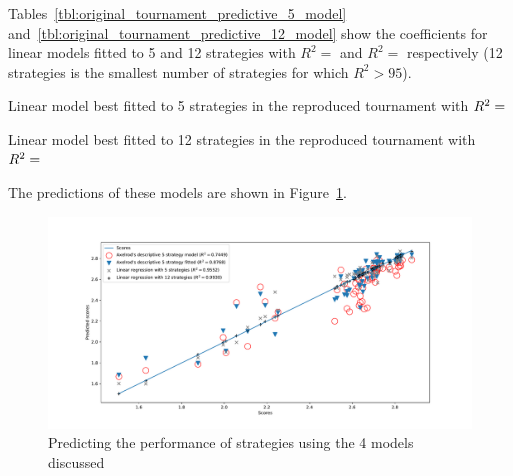 \documentclass{article}
\begin{document}
Tables~\ref{tbl:original_tournament_predictive_5_model}
and~\ref{tbl:original_tournament_predictive_12_model} show the coefficients for
linear models fitted to 5 and 12 strategies with
\(R^2=\) and
\(R^2=\)
respectively (12 strategies is the smallest number of strategies for which
\(R^2>95\)).


\begin{table}[!hbtp]
        \centering
        
        \caption{Linear model best fitted to 5 strategies in the reproduced tournament
                 with
             \(R^2=\protect\)}
        \label{tbl:original_tournament_predictive_5_model}
\end{table}

\begin{table}[!hbtp]
        \centering
        
        \caption{Linear model best fitted to 12 strategies in the reproduced tournament
                 with
             \(R^2=\protect\)}
        \label{tbl:original_tournament_predictive_12_model}
\end{table}

The predictions of these models are shown in
Figure~\ref{fig:original_tournament_predictive_score_models}.

\begin{figure}[!hbtp]
    \centering
    \includegraphics[width=.9\textwidth]{assets/original_tournament_predictive_score_models.pdf}
    \caption{Predicting the performance of strategies using the 4 models
             discussed}
    \label{fig:original_tournament_predictive_score_models}
\end{figure}
\end{document}
